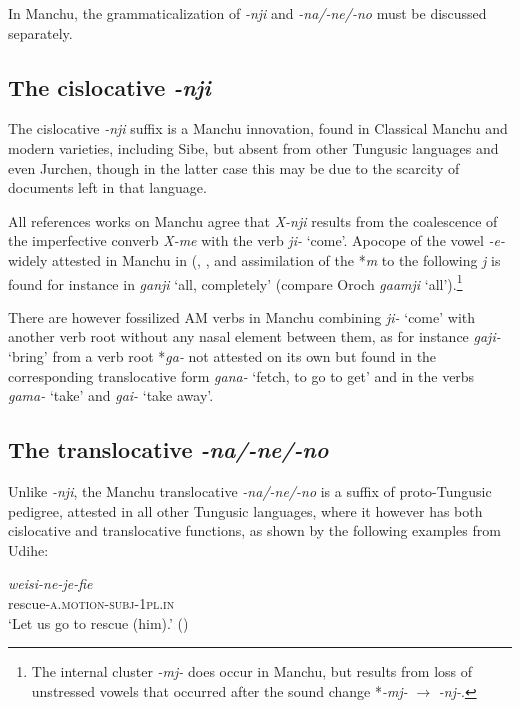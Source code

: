 \documentclass{article}
\newcommand{\ipa}[1]{\textit{{\phon\mbox{#1}}}} %
\begin{document}
In Manchu, the grammaticalization of \ipa{-nji} and \ipa{-na/-ne/-no} must be discussed separately.

\subsection{The cislocative \ipa{-nji} }
The cislocative \ipa{-nji} suffix is a Manchu innovation, found in Classical Manchu and modern varieties, including Sibe, but absent from other Tungusic languages and even Jurchen, though in the latter case this may be due to the scarcity of documents left in that language.

All references works on Manchu agree that \ipa{X-nji} results from the coalescence of the imperfective converb \ipa{X-me} with the verb \ipa{ji-} `come'. Apocope of the vowel \ipa{-e-} widely attested in Manchu in (\citealt[18-19]{hattori56manchu}, \citet[43-44]{gorelova02manchu}, and assimilation of the *\ipa{m} to the following \ipa{j} is found for instance in \ipa{ganji} `all, completely' (compare Oroch \ipa{gaamji} `all').\footnote{The internal cluster \ipa{-mj-} does occur in Manchu, but results from loss of unstressed vowels that occurred after the sound change *\ipa{-mj-} $\rightarrow$ \ipa{-nj-}. }


There are however fossilized AM verbs in Manchu combining \ipa{ji-} `come' with another verb root without any nasal element between them, as for instance \ipa{gaji-} `bring' from a verb root *\ipa{ga-} not attested on its own but found in the corresponding translocative form \ipa{gana-} `fetch, to go to get' and in the verbs \ipa{gama-} `take' and  \ipa{gai-} `take away'. 


\subsection{The translocative \ipa{-na/-ne/-no} } \label{sec:translocative}
Unlike \ipa{-nji}, the Manchu translocative \ipa{-na/-ne/-no} is a suffix of proto-Tungusic pedigree, attested in all other Tungusic languages, where it however has both cislocative and translocative functions, as shown by the following examples from Udihe:

\begin{exe}
\ex 
\gll \ipa{weisi-ne-je-fie} \\
rescue-\textsc{a.motion-subj-1pl.in} \\
\glt ‘Let us go to rescue (him).’ (\citealt[47]{nikolaeva01udihe})
\end{exe}
\end{document}
